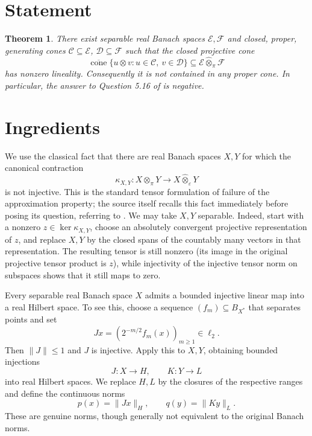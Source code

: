 \documentclass[11pt]{article}
\newtheorem{theorem}{Theorem}
\newcommand{\Espace}{\mathcal E}
\newcommand{\Fspace}{\mathcal F}
\newcommand{\ConeE}{\mathcal C}
\newcommand{\ConeF}{\mathcal D}
\newcommand{\tp}{\widehat\otimes_\pi}
\newcommand{\te}{\widehat\otimes_\varepsilon}
\begin{document}
\section{Statement}

\begin{theorem}\label{thm:main}
There exist separable real Banach spaces $\Espace,\Fspace$ and closed, proper, generating cones $\ConeE\subseteq\Espace$, $\ConeF\subseteq\Fspace$ such that the closed projective cone
\[
 \overline{\operatorname{cone}}\{u\otimes v:u\in\ConeE,\ v\in\ConeF\}
 \subseteq \Espace\tp\Fspace
\]
has nonzero lineality.  Consequently it is not contained in any proper cone.  In particular, the answer to Question 5.16 of \cite{source} is negative.
\end{theorem}

\section{Ingredients}

We use the classical fact that there are real Banach spaces $X,Y$ for which the canonical contraction
\begin{equation}\label{eq:kappa}
 \kappa_{X,Y}:X\tp Y\longrightarrow X\te Y
\end{equation}
is not injective.  This is the standard tensor formulation of failure of the approximation property; the source itself recalls this fact immediately before posing its question, referring to \cite[Theorem 5.6]{defantfloret}.  We may take $X,Y$ separable.  Indeed, start with a nonzero $z\in\ker\kappa_{X,Y}$, choose an absolutely convergent projective representation of $z$, and replace $X,Y$ by the closed spans of the countably many vectors in that representation.  The resulting tensor is still nonzero (its image in the original projective tensor product is $z$), while injectivity of the injective tensor norm on subspaces shows that it still maps to zero.

Every separable real Banach space $X$ admits a bounded injective linear map into a real Hilbert space.  To see this, choose a sequence $(f_m)\subseteq B_{X^*}$ that separates points and set
\[
 Jx=(2^{-m/2}f_m(x))_{m\ge1}\in\ell_2.
\]
Then $\|J\|\le1$ and $J$ is injective.  Apply this to $X,Y$, obtaining bounded injections
\[
 J:X\to H,\qquad K:Y\to L
\]
into real Hilbert spaces.  We replace $H,L$ by the closures of the respective ranges and define the continuous norms
\[
 p(x)=\|Jx\|_H,\qquad q(y)=\|Ky\|_L.
\]
These are genuine norms, though generally not equivalent to the original Banach norms.
\end{document}
